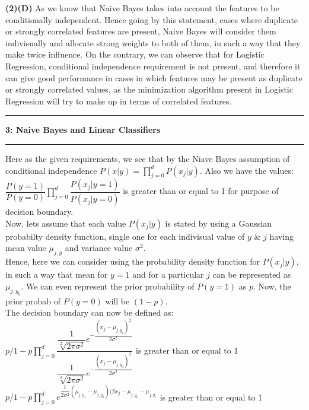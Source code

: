 \documentclass[11pt]{article}
\newcommand\question[2]{\vspace{.25in}\hrule\textbf{#1: #2}\vspace{.5em}\hrule\vspace{.10in}}
\renewcommand\part[1]{\vspace{.10in}\textbf{(#1)}}
\begin{document}
\part{2}\textbf{(D)} As we know that Naive Bayes takes into account the features to be conditionally independent. Hence going by this statement, cases where duplicate or strongly correlated features are present, Naive Bayes will consider them indivisually and allocate strong weights to both of them, in such a way that they make twice influence. On the contrary, we can observe that for Logistic Regression, conditional independence requirement is not present, and therefore it can give good performance in cases in which features may be present as duplicate or strongly correlated values, as the minimization algorithm present in Logistic Regression will try to make up in terms of correlated features.\\ 

\question{3}{Naive Bayes and Linear Classifiers}

Here as the given requirements, we see that by the Niave Bayes assumption of conditional independence
$P(x|y) = \prod_{j=0}^d P(x_j|y)$. Also we have the values:\\
$\dfrac{P(y=1)}{P(y=0)}\prod_{j=0}^d \dfrac{P(x_j|y=1)}{P(x_j|y=0)}$ is greater than or equal to 1 for purpose of decision boundary.\\
Now, lets assume that each value $P(x_j|y)$ is stated by using a Gaussian probabilty density function, single one for each indivisual value of $y$ \& $j$ having mean value $\mu_{j,y}$ and variance value $\sigma^2$.\\
Hence, here we can consider using the probability density function for $P(x_j|y)$, in such a way that mean for  $y=1$ and for a particular $j$ can be represented as $\mu_{j,y_0}$. We can even represent the prior probability of $P(y=1)$ as $p$. Now, the prior probab of $P(y=0)$ will be $(1-p)$.\\
The decision boundary can now be defined as:\\
${p}/{1-p} \prod_{j=0}^d \dfrac{\dfrac{1}{\sqrt[2]{2\pi \sigma^2}}e^{-\dfrac{(x_j - \mu_{j,y_1})^2}{2\sigma^2}}}{\dfrac{1}{\sqrt[2]{2\pi \sigma^2}}e^{-\dfrac{(x_j - \mu_{j,y_0})^2}{2\sigma^2}}}$ is greater than or equal to 1\\

${p}/{1-p} \prod_{j=0}^d e^{\dfrac{1}{2\sigma^2}(\mu_{j,y_1} - \mu_{j,y_0})(2x_j - \mu_{j,y_0} - \mu_{j,y_1}}$ is greater than or equal to 1\\[15pt]
\end{document}
